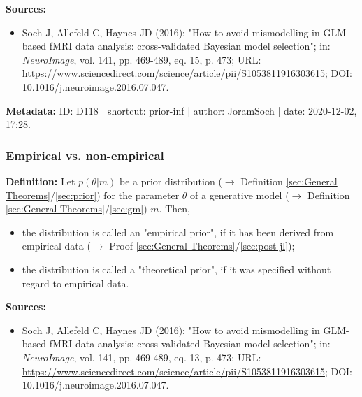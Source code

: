 \documentclass[a4paper,12pt,twoside]{book}
\begin{document}
\vspace{1em}
\textbf{Sources:}
\begin{itemize}
\item Soch J, Allefeld C, Haynes JD (2016): "How to avoid mismodelling in GLM-based fMRI data analysis: cross-validated Bayesian model selection"; in: \textit{NeuroImage}, vol. 141, pp. 469-489, eq. 15, p. 473; URL: \url{https://www.sciencedirect.com/science/article/pii/S1053811916303615}; DOI: 10.1016/j.neuroimage.2016.07.047.
\end{itemize}


\vspace{1em}
\textbf{Metadata:} ID: D118 | shortcut: prior-inf | author: JoramSoch | date: 2020-12-02, 17:28.
\vspace{1em}



\subsubsection[\textit{Empirical vs. non-empirical}]{Empirical vs. non-empirical} \label{sec:prior-emp}
\setcounter{equation}{0}

\textbf{Definition:} Let $p(\theta \vert m)$ be a prior distribution ($\rightarrow$ Definition \ref{sec:General Theorems}/\ref{sec:prior}) for the parameter $\theta$ of a generative model ($\rightarrow$ Definition \ref{sec:General Theorems}/\ref{sec:gm}) $m$. Then,

\begin{itemize}

\item the distribution is called an "empirical prior", if it has been derived from empirical data ($\rightarrow$ Proof \ref{sec:General Theorems}/\ref{sec:post-jl});

\item the distribution is called a "theoretical prior", if it was specified without regard to empirical data.

\end{itemize}


\vspace{1em}
\textbf{Sources:}
\begin{itemize}
\item Soch J, Allefeld C, Haynes JD (2016): "How to avoid mismodelling in GLM-based fMRI data analysis: cross-validated Bayesian model selection"; in: \textit{NeuroImage}, vol. 141, pp. 469-489, eq. 13, p. 473; URL: \url{https://www.sciencedirect.com/science/article/pii/S1053811916303615}; DOI: 10.1016/j.neuroimage.2016.07.047.
\end{itemize}
\end{document}
